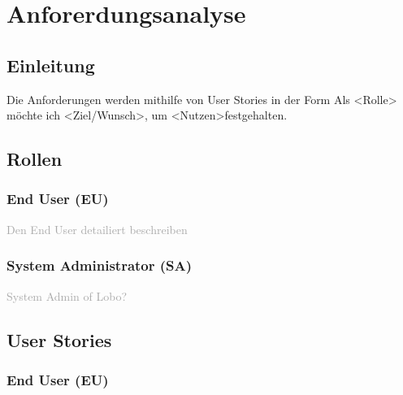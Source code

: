 \chapter{Anforerdungsanalyse}
\label{sec:anforderungsanalyse}


\section{Einleitung}
Die Anforderungen werden mithilfe von User Stories in der Form \glqq Als <Rolle> möchte ich <Ziel/Wunsch>, um <Nutzen>\grqq festgehalten.

\section{Rollen}
\subsection{End User (EU)}
\textcolor{darkgray}{
	Den End User detailiert beschreiben
}
\subsection{System Administrator (SA)}
\textcolor{darkgray}{
	System Admin of Lobo?
}

\section{User Stories}
\subsection{End User (EU)}


\begin{usecase}
\end{usecase}

